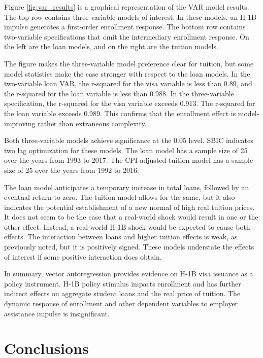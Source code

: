 \documentclass[review]{elsarticle}
\begin{document}
Figure \ref{fig:var_results} is a graphical representation of the VAR model results.
The top row contains three-variable models of interest.
In these models, an H-1B impulse generates a first-order enrollment response.
The bottom row contains two-variable specifications that omit the intermediary enrollment response.
On the left are the loan models, and on the right are the tuition models.

The figure makes the three-variable model preference clear for tuition,
but some model statistics make the case stronger with respect to the loan models.
In the two-variable loan VAR, the r-squared for the visa variable is less than 0.89,
and the r-squared for the loan variable is less than 0.988.
In the three-variable specification, the r-squared for the visa variable exceeds 0.913.
The r-squared for the loan variable exceeds 0.989.
This confirms that the enrollment effect is model-improving rather than extraneous complexity.

Both three-variable models achieve significance at the 0.05 level.
SBIC indicates two lag optimization for these models.
The loan model has a sample size of 25 over the years from 1993 to 2017.
The CPI-adjusted tuition model has a sample size of 25 over the years from 1992 to 2016.

The loan model anticipates a temporary increase in total loans, followed by an eventual return to zero.
The tuition model allows for the same, but it also indicates the potential establishment of a new normal
of high real tuition prices.
It does not seem to be the case that a real-world shock would result in one or the other effect.
Instead, a real-world H-1B shock would be expected to cause both effects.
The interaction between loans and higher tuition effects is weak, as previously noted, but it is positively signed.
These models understate the effects of interest if some positive interaction does obtain.

In summary, vector autoregression provides evidence on H-1B visa issuance as a policy instrument.
H-1B policy stimulus impacts enrollment and has further indirect effects on aggregate student loans and the real price of tuition.
The dynamic response of enrollment and other dependent variables to employer assistance impulse is insignificant.

\section{Conclusions}
\end{document}
